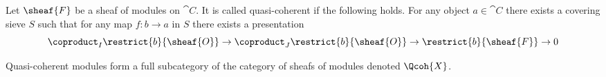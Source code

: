 \begin{definition}
Let $\sheaf{F}$ be a sheaf of modules on $\cat{C}$.
It is called quasi-coherent if the following holds.
For any object $a\in\cat{C}$ 
there exists a covering sieve $S$ 
such that for any map $f:b\rightarrow a$ in $S$ 
there exists a presentation
\[\coproduct_I \restrict{b}{\sheaf{O}} \rightarrow \coproduct_J \restrict{b}{\sheaf{O}} 
	\rightarrow \restrict{b}{\sheaf{F}} \rightarrow 0\]

Quasi-coherent modules form a full subcategory of the category of sheafs of modules denoted $\Qcoh{X}$.
\end{definition}

